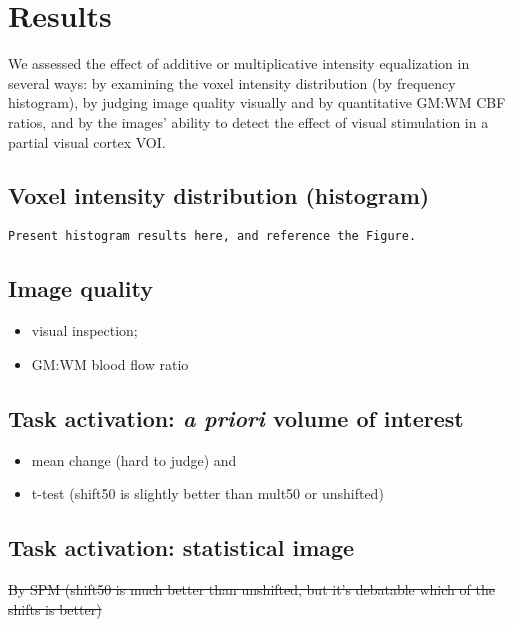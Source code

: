 \section{Results}
We assessed the effect of additive or multiplicative intensity equalization in several ways: by examining the voxel intensity distribution (by frequency histogram), by judging image quality visually and by quantitative GM:WM CBF ratios, and by the images' ability to detect the effect of visual stimulation in a partial visual cortex VOI. 

\subsection{Voxel intensity distribution (histogram)}
\verb|Present histogram results here, and reference the Figure.|

\subsection{Image quality}
  \begin{itemize}
  \item visual inspection;
  \item GM:WM blood flow ratio
  \end{itemize}

\subsection{Task activation: \textit{a priori} volume of interest}
  \begin{itemize} 
    \item mean change (hard to judge) and 
    \item t-test (shift50 is slightly better than mult50 or unshifted)
  \end{itemize}

\subsection{Task activation: statistical image}
\sout{By SPM (shift50 is much better than unshifted, but it's debatable which of the shifts is better)}

